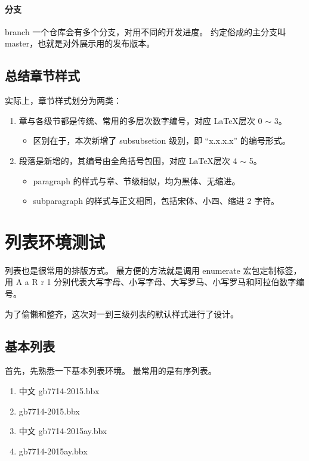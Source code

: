 \documentclass[../Main/thesis]{subfiles}
\begin{document}
\paragraph{分支}
branch
一个仓库会有多个分支，对用不同的开发进度。
约定俗成的主分支叫master，也就是对外展示用的发布版本。

\subsection{总结章节样式}
\label{ssc:summary-title-formats}

实际上，章节样式划分为两类：
\begin{enumerate}[(1)]
  \item 章与各级节都是传统、常用的多层次数字编号，对应 \LaTeX 层次 0 $\sim$ 3。
  \begin{itemize}[\textbullet]
    \item 区别在于，本次新增了 subsubsetion 级别，即 “x.x.x.x” 的编号形式。
  \end{itemize}
  \item 段落是新增的，其编号由全角括号包围，对应 \LaTeX 层次 4 $\sim$ 5。
  \begin{itemize}[\textbullet]
    \item paragraph 的样式与章、节级相似，均为黑体、无缩进。
    \item subparagraph 的样式与正文相同，包括宋体、小四、缩进 2 字符。
  \end{itemize}
\end{enumerate}

\section{列表环境测试} \label{sec:list}

列表也是很常用的排版方式。
最方便的方法就是调用 enumerate 宏包定制标签，用 A a R r 1 分别代表大写字母、小写字母、大写罗马、小写罗马和阿拉伯数字编号。

为了偷懒和整齐，这次对一到三级列表的默认样式进行了设计。

\subsection{基本列表} \label{ssc:basiclist}

首先，先熟悉一下基本列表环境。
最常用的是有序列表。

\begin{enumerate}
  \item 中文 gb7714-2015.bbx
  \item gb7714-2015.bbx
  \item 中文 gb7714-2015ay.bbx
  \item gb7714-2015ay.bbx
\end{enumerate}
\end{document}
